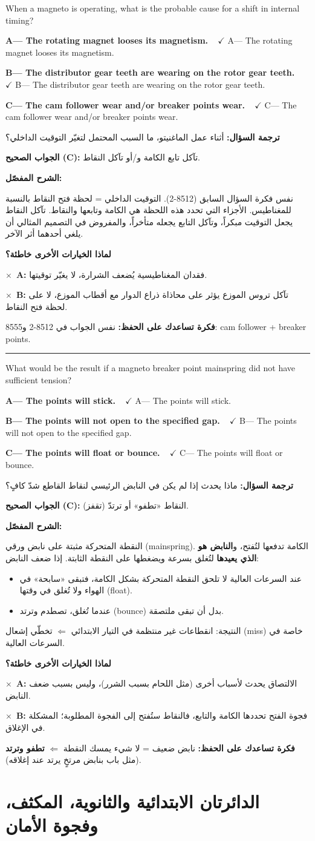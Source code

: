 \documentclass[11pt,a4paper]{article}
\newcommand{\en}[1]{\textenglish{#1}}
\newcommand{\correctletter}{}
\newcommand{\opt}[2]{%
  \ifdefstring{\correctletter}{#1}%
    {\textcolor{ansgreen}{\textbf{#1— #2\ \ $\checkmark$}}}%
    {#1— #2}\par}
\newcommand{\Q}[6]{%
  \renewcommand{\correctletter}{#6}%
  \par\bigskip
  \phantomsection\label{q#1}%
  \begin{tcolorbox}[enhanced,breakable,colback=qback,colframe=qframe,
      arc=2mm,boxrule=0.8pt,fonttitle=\bfseries,
      title={\en{Question #1}}]
    \begin{english}
      #2\par\smallskip
      \opt{A}{#3}\opt{B}{#4}\opt{C}{#5}
    \end{english}
  \end{tcolorbox}}
\newcommand{\tr}[1]{\textbf{\textcolor{qframe}{ترجمة السؤال:}} #1\par}
\newcommand{\ans}[2]{%
  \begin{tcolorbox}[colback=ansback,colframe=ansgreen,boxrule=0.6pt,arc=1.5mm,
      left=4pt,right=4pt,top=2pt,bottom=2pt]
    \textbf{\textcolor{ansgreen}{الجواب الصحيح (\en{#1}):}} #2
  \end{tcolorbox}}
\newcommand{\sharh}[1]{\textbf{\textcolor{conceptc}{الشرح المفصّل:}}\par #1\par}
\newcommand{\nohead}{\textbf{\textcolor{wrongc}{لماذا الخيارات الأخرى خاطئة؟}}\par}
\newcommand{\no}[2]{\hspace*{1em}\textcolor{wrongc}{$\times$}\ \textbf{\en{#1}:} #2\par}
\newcommand{\tip}[1]{%
  \begin{tcolorbox}[colback=tipback,colframe=tipframe,boxrule=0.5pt,arc=1.5mm,
      left=4pt,right=4pt,top=2pt,bottom=2pt]
    \textbf{فكرة تساعدك على الحفظ:} #1
  \end{tcolorbox}}
\newcommand{\qsep}{\par\medskip\noindent\textcolor{qframe!40}{\rule{\linewidth}{0.4pt}}\par}
\begin{document}
\Q{8555}{When a magneto is operating, what is the probable cause for a shift in internal timing?}
{The rotating magnet looses its magnetism.}
{The distributor gear teeth are wearing on the rotor gear teeth.}
{The cam follower wear and/or breaker points wear.}{C}
\tr{أثناء عمل الماغنيتو، ما السبب المحتمل لتغيّر التوقيت الداخلي؟}
\ans{C}{تآكل تابع الكامة و/أو تآكل النقاط.}
\sharh{نفس فكرة السؤال السابق (\en{8512-2}). التوقيت الداخلي = لحظة فتح النقاط بالنسبة للمغناطيس. الأجزاء التي تحدد هذه اللحظة هي الكامة وتابعها والنقاط. تآكل النقاط يجعل التوقيت مبكراً، وتآكل التابع يجعله متأخراً، والمفروض في التصميم المثالي أن يلغي أحدهما أثر الآخر.}
\nohead
\no{A}{فقدان المغناطيسية يُضعف الشرارة، لا يغيّر توقيتها.}
\no{B}{تآكل تروس الموزع يؤثر على محاذاة ذراع الدوار مع أقطاب الموزع، لا على لحظة فتح النقاط.}
\tip{نفس الجواب في 8512-2 و8555: \en{cam follower + breaker points}.}
\qsep

\Q{8611}{What would be the result if a magneto breaker point mainspring did not have sufficient tension?}
{The points will stick.}
{The points will not open to the specified gap.}
{The points will float or bounce.}{C}
\tr{ماذا يحدث إذا لم يكن في النابض الرئيسي لنقاط القاطع شدّ كافٍ؟}
\ans{C}{النقاط «تطفو» أو ترتدّ (تقفز).}
\sharh{النقطة المتحركة مثبتة على نابض ورقي (\en{mainspring}). الكامة تدفعها لتُفتح، و\textbf{النابض هو الذي يعيدها} لتُغلق بسرعة ويضغطها على النقطة الثابتة. إذا ضعف النابض:
\begin{itemize}
  \item عند السرعات العالية لا تلحق النقطة المتحركة بشكل الكامة، فتبقى «سابحة» في الهواء ولا تُغلق في وقتها (\en{float}).
  \item عندما تُغلق، تصطدم وترتد (\en{bounce}) بدل أن تبقى ملتصقة.
\end{itemize}
النتيجة: انقطاعات غير منتظمة في التيار الابتدائي $\Leftarrow$ تخطّي إشعال (\en{miss}) خاصة في السرعات العالية.}
\nohead
\no{A}{الالتصاق يحدث لأسباب أخرى (مثل اللحام بسبب الشرر)، وليس بسبب ضعف النابض.}
\no{B}{فجوة الفتح تحددها الكامة والتابع، فالنقاط ستُفتح إلى الفجوة المطلوبة؛ المشكلة في الإغلاق.}
\tip{نابض ضعيف = لا شيء يمسك النقطة $\Leftarrow$ \textbf{تطفو وترتد} (مثل باب بنابض مرتخٍ يرتد عند إغلاقه).}

\newpage
\section{الدائرتان الابتدائية والثانوية، المكثف، وفجوة الأمان}
\end{document}
